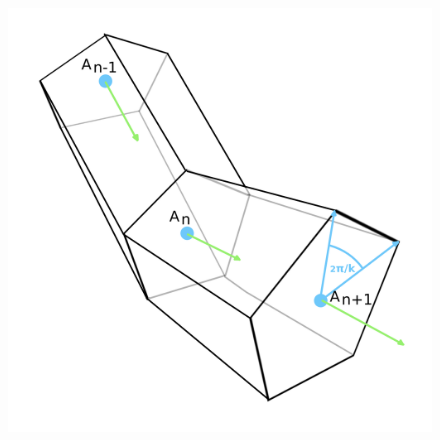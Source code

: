 \documentclass[aspectratio=169]{beamer}
\begin{document}
\begin{frame}[allowframebreaks]
	
	\begin{columns}
		\begin{column}{0.5\textwidth}
			\begin{figure}
				\centering
				\includegraphics[width=1\textwidth]{rope_model.png}
			\end{figure}
		\end{column}	
		

\end{columns}
\end{frame}
\end{document}
